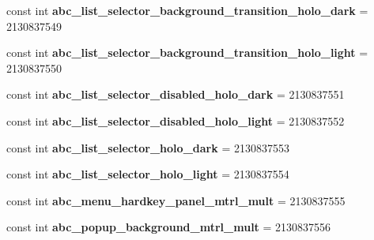 \begin{DoxyCompactItemize}
const int {\bfseries abc\+\_\+list\+\_\+selector\+\_\+background\+\_\+transition\+\_\+holo\+\_\+dark} = 2130837549
\item 
\mbox{\label{class_sample_app_1_1_droid_1_1_resource_1_1_drawable_a1efdbf8208ec2b508a071a6f9f5e27b8}} 
const int {\bfseries abc\+\_\+list\+\_\+selector\+\_\+background\+\_\+transition\+\_\+holo\+\_\+light} = 2130837550
\item 
\mbox{\label{class_sample_app_1_1_droid_1_1_resource_1_1_drawable_a1f6bd075a74ff0c89f131c296999b33c}} 
const int {\bfseries abc\+\_\+list\+\_\+selector\+\_\+disabled\+\_\+holo\+\_\+dark} = 2130837551
\item 
\mbox{\label{class_sample_app_1_1_droid_1_1_resource_1_1_drawable_a40a66625b19a0169a7ce51d23dd70095}} 
const int {\bfseries abc\+\_\+list\+\_\+selector\+\_\+disabled\+\_\+holo\+\_\+light} = 2130837552
\item 
\mbox{\label{class_sample_app_1_1_droid_1_1_resource_1_1_drawable_a06ff48d12f69a38c1fe60e2e0cf5522c}} 
const int {\bfseries abc\+\_\+list\+\_\+selector\+\_\+holo\+\_\+dark} = 2130837553
\item 
\mbox{\label{class_sample_app_1_1_droid_1_1_resource_1_1_drawable_a5d13735b273abd6580eca3cd1e514842}} 
const int {\bfseries abc\+\_\+list\+\_\+selector\+\_\+holo\+\_\+light} = 2130837554
\item 
\mbox{\label{class_sample_app_1_1_droid_1_1_resource_1_1_drawable_a62aace423ec55e50508e63a4740f1a5b}} 
const int {\bfseries abc\+\_\+menu\+\_\+hardkey\+\_\+panel\+\_\+mtrl\+\_\+mult} = 2130837555
\item 
\mbox{\label{class_sample_app_1_1_droid_1_1_resource_1_1_drawable_ab25f7aeb171ae7fb4096c09ad701f924}} 
const int {\bfseries abc\+\_\+popup\+\_\+background\+\_\+mtrl\+\_\+mult} = 2130837556
\item 
\mbox{\label{class_sample_app_1_1_droid_1_1_resource_1_1_drawable_a0094590bf5e1e53aba3fffe800a6b308}} 

\end{DoxyCompactItemize}
